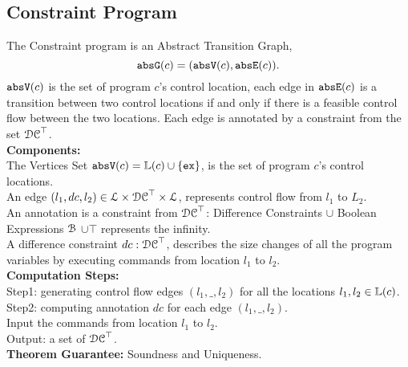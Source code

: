 \subsection{Constraint Program}
\label{sec:abs_prog}
The Constraint program is an Abstract Transition Graph,
\[{\mathtt{abs}}{{\mathtt{G}}}(c) =({\mathtt{abs}}{{\mathtt{V}}}(c), {\mathtt{abs}}{{\mathtt{E}}}(c)).\]
%
${\mathtt{abs}}{{\mathtt{V}}}(c)$ is the set of program $c$'s control location, each edge in ${\mathtt{abs}}{{\mathtt{E}}}(c)$ is a transition
between two control locations if and only if there is a feasible control flow between the two locations.
Each edge is annotated by a constraint
from the set $\mathcal{DC}^{\top}$.
\\
\textbf{Components:} 
\\
The Vertices Set ${\mathtt{abs}}{{\mathtt{V}}}(c) = \mathbb{L}(c)\cup\{{{\mathtt{ex}}}\}$, is the set of program $c$'s control locations.
\\
An edge $(l_1, dc, l_2) \in \mathcal{L} \times \mathcal{DC}^{\top} \times \mathcal{L}$, represents control flow from $l_1$ to $L_2$.
\\
An annotation is a constraint from $\mathcal{DC}^{\top}$: Difference Constraints $\cup$ Boolean Expressions $\mathcal{B}$ $\cup \top$ represents the infinity.
\\
A difference constraint $dc: \mathcal{DC}^{\top}$,
describes the size changes of all the program variables by executing commands from location $l_1$ to $l_2$.
\\
\textbf{Computation Steps:} 
\\
Step1: generating control flow edges $(l_1, \_, l_2)$ for all the locations $l_1, l_2 \in \mathbb{L}(c)$.
\\
Step2: computing annotation $dc$ for each edge $(l_1, \_, l_2)$.
\\
Input the commands from location $l_1$ to $l_2$.
\\
Output: a set of $\mathcal{DC}^{\top}$.
\\
\textbf{Theorem Guarantee:}
Soundness and Uniqueness.
